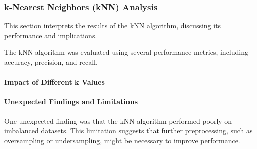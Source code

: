 \subsubsection{k-Nearest Neighbors (kNN) Analysis}
\label{subsubsec:discussion-knn}

This section interprets the results of the kNN algorithm, discussing its performance and implications.

The kNN algorithm was evaluated using several performance metrics, including accuracy, precision, and recall.





\paragraph{Impact of Different k Values}


\paragraph{Unexpected Findings and Limitations}
One unexpected finding was that the kNN algorithm performed poorly on imbalanced datasets.
This limitation suggests that further preprocessing, such as oversampling or undersampling,
might be necessary to improve performance.


